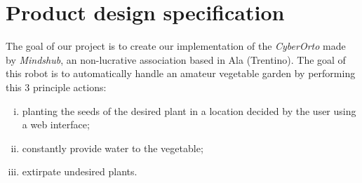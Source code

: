 \section{Product design specification}
	The goal of our project is to create our implementation of the \textit{CyberOrto} \cite{cyberorto} made by \textit{Mindshub}, an non-lucrative association based in Ala (Trentino). The goal of this robot is to automatically handle an amateur vegetable garden by performing this 3 principle actions:
	\begin{enumerate}[i)]
		\item planting the seeds  of the desired plant in a location decided by the user using a web interface;
		\item constantly provide water to the vegetable;
		\item extirpate undesired plants.
	\end{enumerate}

